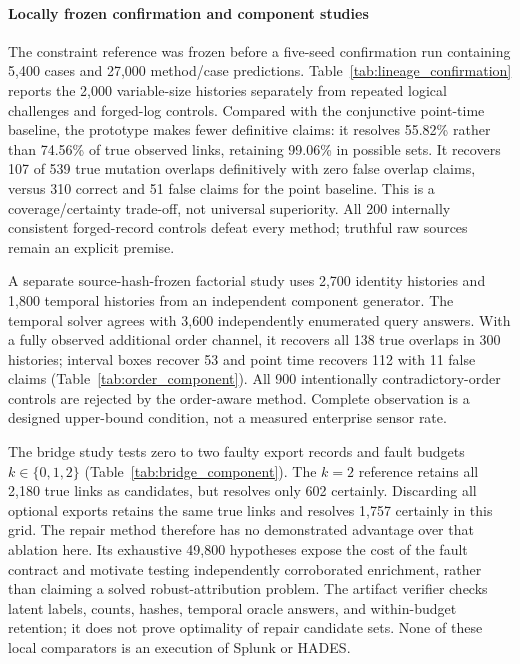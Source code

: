 \paragraph{Locally frozen confirmation and component studies}
The constraint reference was frozen before a five-seed confirmation run containing 5,400 cases and 27,000 method/case predictions. Table~\ref{tab:lineage_confirmation} reports the 2,000 variable-size histories separately from repeated logical challenges and forged-log controls. Compared with the conjunctive point-time baseline, the prototype makes fewer definitive claims: it resolves 55.82\% rather than 74.56\% of true observed links, retaining 99.06\% in possible sets. It recovers 107 of 539 true mutation overlaps definitively with zero false overlap claims, versus 310 correct and 51 false claims for the point baseline. This is a coverage/certainty trade-off, not universal superiority. All 200 internally consistent forged-record controls defeat every method; truthful raw sources remain an explicit premise.

A separate source-hash-frozen factorial study uses 2,700 identity histories and 1,800 temporal histories from an independent component generator. The temporal solver agrees with 3,600 independently enumerated query answers. With a fully observed additional order channel, it recovers all 138 true overlaps in 300 histories; interval boxes recover 53 and point time recovers 112 with 11 false claims (Table~\ref{tab:order_component}). All 900 intentionally contradictory-order controls are rejected by the order-aware method. Complete observation is a designed upper-bound condition, not a measured enterprise sensor rate.

The bridge study tests zero to two faulty export records and fault budgets $k\in\{0,1,2\}$ (Table~\ref{tab:bridge_component}). The $k=2$ reference retains all 2,180 true links as candidates, but resolves only 602 certainly. Discarding all optional exports retains the same true links and resolves 1,757 certainly in this grid. The repair method therefore has no demonstrated advantage over that ablation here. Its exhaustive 49,800 hypotheses expose the cost of the fault contract and motivate testing independently corroborated enrichment, rather than claiming a solved robust-attribution problem. The artifact verifier checks latent labels, counts, hashes, temporal oracle answers, and within-budget retention; it does not prove optimality of repair candidate sets. None of these local comparators is an execution of Splunk or HADES.

